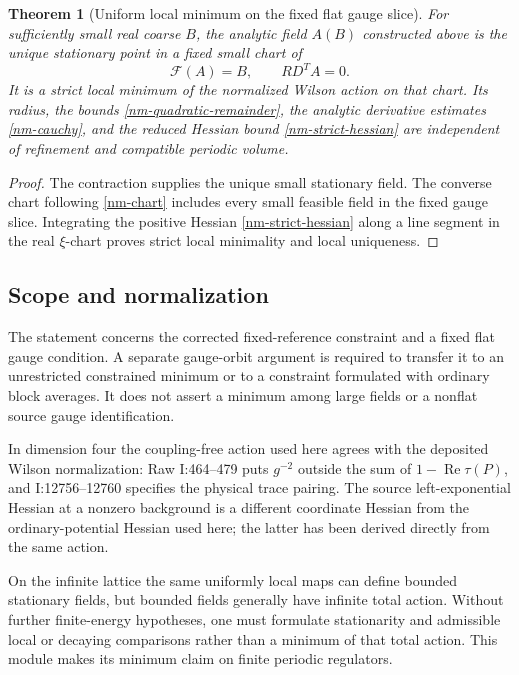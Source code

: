 \documentclass[11pt]{article}
\newtheorem{theorem}{Theorem}[section]
\theoremstyle{remark}
\begin{document}
\begin{theorem}[Uniform local minimum on the fixed flat gauge slice]
\label{nm-theorem}
For sufficiently small real coarse $B$, the analytic field $A(B)$
constructed above is the unique stationary point in a fixed small
chart of
\[
 \mathcal F(A)=B,\qquad RD^TA=0.
\]
It is a strict local minimum of the normalized Wilson action on
that chart. Its radius, the bounds \eqref{nm-quadratic-remainder},
the analytic derivative estimates \eqref{nm-cauchy}, and the reduced
Hessian bound \eqref{nm-strict-hessian} are independent of
refinement and compatible periodic volume.
\end{theorem}

\begin{proof}
The contraction supplies the unique small stationary field. The
converse chart following \eqref{nm-chart} includes every small
feasible field in the fixed gauge slice. Integrating the positive
Hessian \eqref{nm-strict-hessian} along a line segment in the real
$\xi$-chart proves strict local minimality and local uniqueness.
\end{proof}

\subsection{Scope and normalization}
\label{nm-scope}

The statement concerns the corrected fixed-reference constraint
and a fixed flat gauge condition. A separate gauge-orbit argument
is required to transfer it to an unrestricted constrained minimum
or to a constraint formulated with ordinary block averages. It
does not assert a minimum among large fields or a nonflat source
gauge identification.

In dimension four the coupling-free action used here agrees with
the deposited Wilson normalization: Raw I:464--479 puts $g^{-2}$
outside the sum of $1-\operatorname{Re}\tau(P)$, and
I:12756--12760 specifies the physical trace pairing. The source
left-exponential Hessian at a nonzero background is a different
coordinate Hessian from the ordinary-potential Hessian used here;
the latter has been derived directly from the same action.

On the infinite lattice the same uniformly local maps can define
bounded stationary fields, but bounded fields generally have
infinite total action. Without further finite-energy hypotheses,
one must formulate stationarity and admissible local or decaying
comparisons rather than a minimum of that total action. This
module makes its minimum claim on finite periodic regulators.
\end{document}
